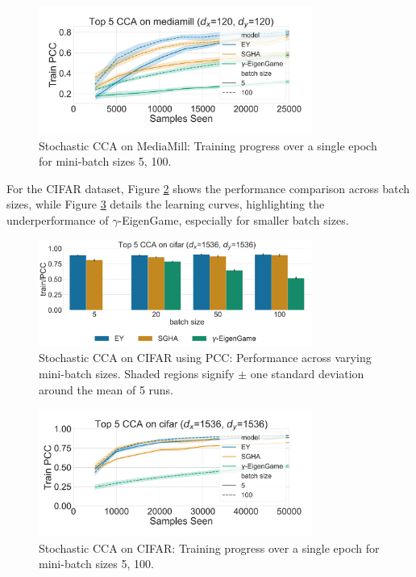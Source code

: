\begin{figure}
    \centering
    \includegraphics[width=0.8\textwidth]{figures/CCA/mediamill_allbatchsizes_pcc}
    \caption{Stochastic CCA on MediaMill: Training progress over a single epoch for mini-batch sizes 5, 100.}
    \label{fig:learningcurve_mediamill}
\end{figure}

For the CIFAR dataset, Figure \ref{fig:corr_cifar} shows the performance comparison across batch sizes, while Figure \ref{fig:learningcurve_cifar} details the learning curves, highlighting the underperformance of $\gamma$-EigenGame, especially for smaller batch sizes.

\begin{figure}
    \centering
    \includegraphics[width=0.8\textwidth]{figures/CCA/cifar_models_different_batch_sizes}
    \caption{Stochastic CCA on CIFAR using PCC: Performance across varying mini-batch sizes. Shaded regions signify \(\pm\) one standard deviation around the mean of 5 runs.}
    \label{fig:corr_cifar}
\end{figure}

\begin{figure}
    \centering
    \includegraphics[width=0.8\textwidth]{figures/CCA/cifar_allbatchsizes_pcc}
    \caption{Stochastic CCA on CIFAR: Training progress over a single epoch for mini-batch sizes 5, 100.}
    \label{fig:learningcurve_cifar}
\end{figure}

